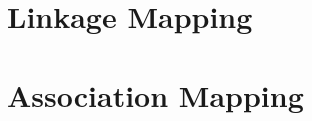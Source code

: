 







\part{Linkage Mapping}
\label{part:exchangeable}







\part{Association Mapping}
\label{part:nonexchangeable}

% 








